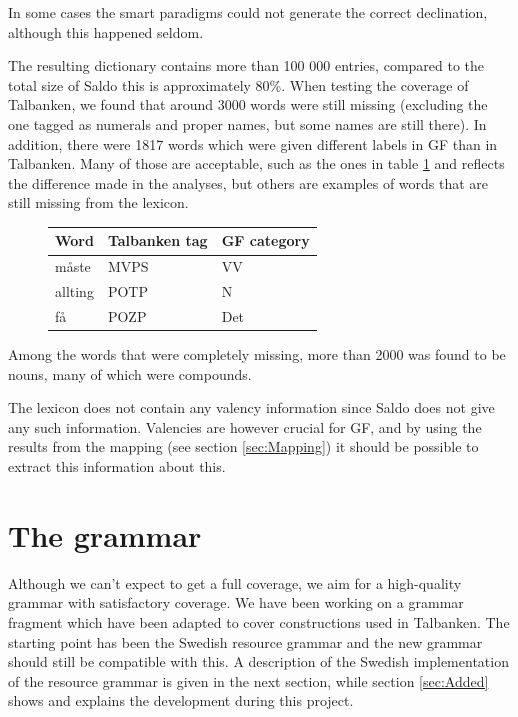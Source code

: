 \documentclass{report}
\begin{document}
In some cases the smart paradigms could not generate the correct declination,
although this happened seldom. %

The resulting dictionary contains more than 100 000 entries, compared to the total size
of Saldo this is approximately 80\%. When testing the coverage of Talbanken,
we found that around 3000 words were still missing (excluding the one tagged as
numerals and proper names, but some names are still there). In addition, there were 1817 words
which were given different labels in GF than in Talbanken. Many of those are
acceptable, such as the ones in table \ref{tab:saldodiff} and reflects the difference 
made in the analyses, but others are examples of words that are still missing from
the lexicon.
\begin{figure}[h]
\begin{tabular}{lll}
Word & Talbanken tag & GF category \\
\hline
måste & MVPS          & VV \\
allting & POTP & N \\
få & POZP & Det \\
\end{tabular}
\caption{}
\label{tab:saldodiff}
\end{figure}
Among the words that were completely missing, more than 2000 was found to be nouns,
many of which were compounds. 

The lexicon does not contain any valency information since Saldo does not give any such
information. Valencies are however crucial for GF, and by using the results from the mapping
(see section \ref{sec:Mapping}) it should be possible to extract this information about this.


\section{The grammar}
\label{sec:prog.grammar}
Although we can't expect to get a full coverage, we aim for a high-quality 
grammar with satisfactory coverage.
We have been working on a grammar fragment which have been adapted to cover
constructions used in Talbanken. The starting point has been the Swedish
resource grammar and the new grammar should still be compatible with this.
A description of the Swedish implementation of the resource grammar is given
in the next section, while section \ref{sec:Added} shows and explains the
development during this project.
\end{document}

